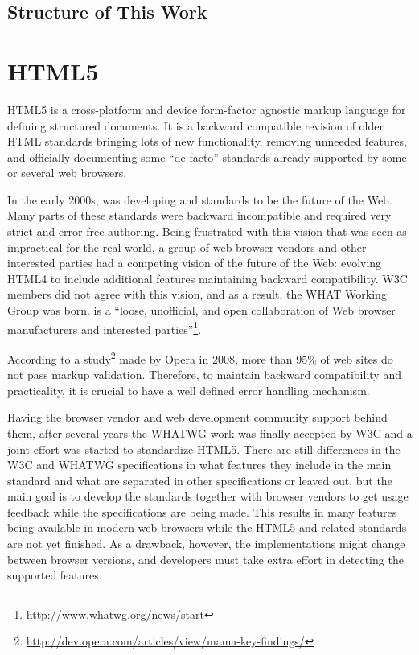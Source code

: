\section{Structure of This Work}
\label{section:structure-of-this-work}



\chapter{HTML5}
\label{chapter:html5}

HTML5 is a cross-platform and device form-factor agnostic markup
language for defining structured documents. It is a backward
compatible revision of older HTML standards bringing lots of new
functionality, removing unneeded features, and officially documenting
some ``de facto'' standards already supported by some or several web
browsers. \cite{pilgrim2010html5}

In the early 2000s,  was developing  and
 standards to be the future of the Web. Many parts of
these standards were backward incompatible and required very strict
and error-free authoring. Being frustrated with this vision that was
seen as impractical for the real world, a group of web browser vendors
and other interested parties had a competing vision of the future of
the Web: evolving HTML4 to include additional features maintaining
backward compatibility. W3C members did not agree with this vision,
and as a result, the WHAT Working Group was born.  is a
``loose, unofficial, and open collaboration of Web browser
manufacturers and interested
parties''\footnote{\url{http://www.whatwg.org/news/start}}. \cite{pilgrim2010html5}

According to a
study\footnote{\url{http://dev.opera.com/articles/view/mama-key-findings/}}
made by Opera in 2008, more than 95\% of web sites do not pass markup
validation. Therefore, to maintain backward compatibility and
practicality, it is crucial to have a well defined error handling
mechanism.

Having the browser vendor and web development community support behind
them, after several years the WHATWG work was finally accepted by W3C
and a joint effort was started to standardize HTML5. There are still
differences in the W3C and WHATWG specifications in what features they
include in the main standard and what are separated in other
specifications or leaved out, but the main goal is to develop the
standards together with browser vendors to get usage feedback while
the specifications are being made. This results in many features being
available in modern web browsers while the HTML5 and related standards
are not yet finished. As a drawback, however, the implementations
might change between browser versions, and developers must take extra
effort in detecting the supported features. \cite{pilgrim2010html5}

